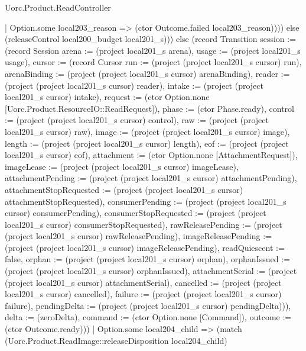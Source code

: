 \begin{lexlean}{Uorc.Product.ReadController}
\begin{semanticmodule}
{{          | Option.some local203_reason => (ctor Outcome.failed local203_reason)))}) else (releaseControl local200_budget local201_s))) else (record Transition {session := (record Session {arena := (project local201_s arena), usage := (project local201_s usage), cursor := (record Cursor {run := (project (project local201_s cursor) run), arenaBinding := (project (project local201_s cursor) arenaBinding), reader := (project (project local201_s cursor) reader), intake := (project (project local201_s cursor) intake), request := (ctor Option.none [Uorc.Product.ResourceIO::ReadRequest]), phase := (ctor Phase.ready), control := (project (project local201_s cursor) control), raw := (project (project local201_s cursor) raw), image := (project (project local201_s cursor) image), length := (project (project local201_s cursor) length), eof := (project (project local201_s cursor) eof), attachment := (ctor Option.none [AttachmentRequest]), imageLease := (project (project local201_s cursor) imageLease), attachmentPending := (project (project local201_s cursor) attachmentPending), attachmentStopRequested := (project (project local201_s cursor) attachmentStopRequested), consumerPending := (project (project local201_s cursor) consumerPending), consumerStopRequested := (project (project local201_s cursor) consumerStopRequested), rawReleasePending := (project (project local201_s cursor) rawReleasePending), imageReleasePending := (project (project local201_s cursor) imageReleasePending), readQuiescent := false, orphan := (project (project local201_s cursor) orphan), orphanIssued := (project (project local201_s cursor) orphanIssued), attachmentSerial := (project (project local201_s cursor) attachmentSerial), cancelled := (project (project local201_s cursor) cancelled), failure := (project (project local201_s cursor) failure), pendingDelta := (project (project local201_s cursor) pendingDelta)})}), delta := (zeroDelta), command := (ctor Option.none [Command]), outcome := (ctor Outcome.ready)}))
        | Option.some local204_child => (match (Uorc.Product.ReadImage::releaseDisposition local204_child)
}
\end{semanticmodule}
\end{lexlean}
